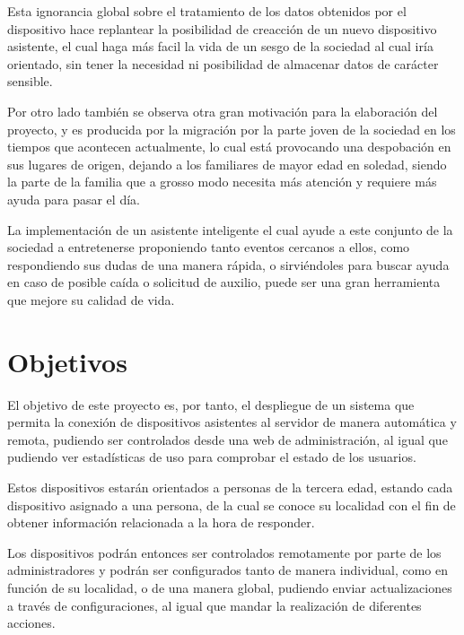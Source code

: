 Esta ignorancia global sobre el tratamiento de los datos obtenidos por el dispositivo hace replantear la posibilidad de creacción de un nuevo dispositivo asistente, el cual haga más facil la vida de un sesgo de la sociedad al cual iría orientado, sin tener la necesidad ni posibilidad de almacenar datos de carácter sensible.

Por otro lado también se observa otra gran motivación para la elaboración del proyecto, y es producida por la migración por la parte joven de la sociedad en los tiempos que acontecen actualmente, lo cual está provocando una despobación en sus lugares de origen, dejando a los familiares de mayor edad en soledad, siendo la parte de la familia que a grosso modo necesita más atención y requiere más ayuda para pasar el día.

La implementación de un asistente inteligente el cual ayude a este conjunto de la sociedad a entretenerse proponiendo tanto eventos cercanos a ellos, como respondiendo sus dudas de una manera rápida, o sirviéndoles para buscar ayuda en caso de posible caída o solicitud de auxilio, puede ser una gran herramienta que mejore su calidad de vida.


\section{Objetivos}

El objetivo de este proyecto es, por tanto, el despliegue de un sistema que permita la conexión de dispositivos asistentes al servidor de manera automática y remota, pudiendo ser controlados desde una web de administración, al igual que pudiendo ver estadísticas de uso para comprobar el estado de los usuarios. 

Estos dispositivos estarán orientados a personas de la tercera edad, estando cada dispositivo asignado a una persona, de la cual se conoce su localidad con el fin de obtener información relacionada a la hora de responder.

Los dispositivos podrán entonces ser controlados remotamente por parte de los administradores y podrán ser configurados tanto de manera individual, como en función de su localidad, o de una manera global, pudiendo enviar actualizaciones a través de configuraciones, al igual que mandar la realización de diferentes acciones.


